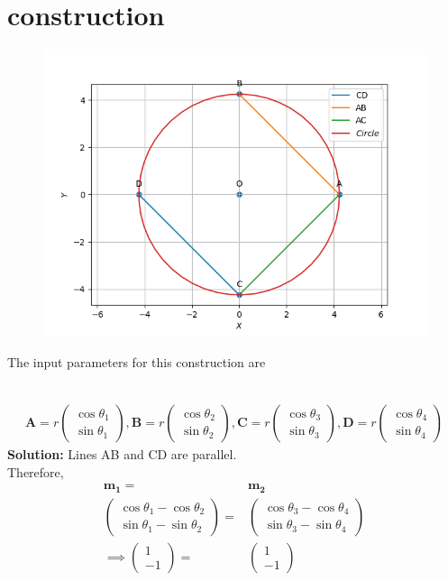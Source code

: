 \documentclass[10pt]{article}
\newcommand{\solution}{\noindent \textbf{Solution: }}
\newcommand{\myvec}[1]{\ensuremath{\begin{pmatrix}#1\end{pmatrix}}}
\let\vec\mathbf{}
\begin{document}
\section{construction}
\begin{figure}[h!]
	\begin{center}
		\includegraphics[width=5in]{./figs/fig.png}
	\end{center}
\caption{}
\label{fig:Fig1}
\end{figure}
The input parameters for this construction are\\
\begin{table}[h!]
	\centering
	
\label{table:1}
\end{table}\\
\begin{align}
\vec{A}=r\myvec{\cos{\theta_1}\\\sin{\theta_1}},\vec{B}=r\myvec{\cos{\theta_2}\\\sin{\theta_2}},\vec{C}=r\myvec{\cos{\theta_3}\\\sin{\theta_3}},\vec{D}=r\myvec{\cos{\theta_4}\\\sin{\theta_4}}
\end{align}
\solution
Lines AB and CD are parallel.\\
Therefore,\\
\begin{align}
\vec{m_1}=&\vec{m_2}\\
\myvec{\cos{\theta_1}-\cos{\theta_2}\\\sin{\theta_1}-\sin{\theta_2}}=&\myvec{\cos{\theta_3}-\cos{\theta_4}\\\sin{\theta_3}-\sin{\theta_4}}\\
\implies\myvec{1\\-1}=&\myvec{1\\-1}
\label{eq:1}
\end{align}
\end{document}
